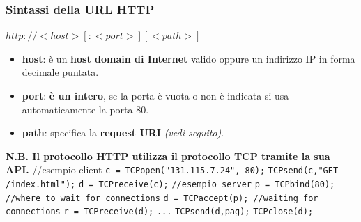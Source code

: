 \documentclass[11pt,a4paper,oneside]{book}
\theoremstyle{definition}
\begin{document}
\pagebreak

\subsubsection{Sintassi della URL HTTP}
\begin{center}
	\LARGE$http: // <host> [ : <port> ] [ <path> ]$
\end{center}
\begin{itemize}
	\item \textbf{host}: è un \textbf{host domain di Internet} valido oppure un indirizzo IP in forma decimale puntata.
	\item \textbf{port}: \textbf{è un intero}, se  la porta è vuota o non è indicata si usa automaticamente la porta 80.
	\item \textbf{path}: specifica la \textbf{request URI} \textit{(vedi seguito)}.
\end{itemize}
\textbf{\underline{N.B.} Il protocollo HTTP utilizza il protocollo TCP tramite la sua API.}\newline\newline
//esempio client\newline
\texttt{c = TCPopen("131.115.7.24", 80);}\newline
\texttt{TCPsend(c,"GET /index.html");}\newline
\texttt{d = TCPreceive(c);}\newline\newline
\texttt{//esempio server}\newline
\texttt{p = TCPbind(80); //where to wait for connections}\newline
\texttt{d = TCPaccept(p); //waiting for connections}\newline
\texttt{r = TCPreceive(d);}\newline
\texttt{...}\newline
\texttt{TCPsend(d,pag);}\newline
\texttt{TCPclose(d);}
\theoremstyle{definition}
\end{document}

